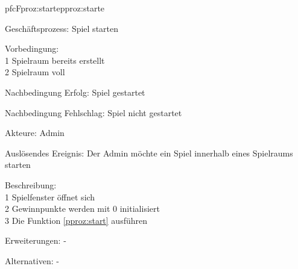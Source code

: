 \begin{description}[leftmargin=3em, style=sameline]
	
	
	\begin{php}{pfc}{F}{proz:starte}{pproz:starte}
		\item [Geschäftsprozess:] Spiel starten
		\item [Vorbedingung:]\hfill\\
		1 Spielraum bereits erstellt \\
		2 Spielraum  voll
		\item [Nachbedingung Erfolg:] Spiel gestartet
		\item [Nachbedingung Fehlschlag:] Spiel nicht gestartet
		\item [Akteure:] Admin
		\item [Auslösendes Ereignis:] Der Admin möchte ein Spiel innerhalb eines Spielraums starten
		\item [Beschreibung:]\hfill\\
		1 Spielfenster öffnet sich \\
		2 Gewinnpunkte werden mit 0 initialisiert \\
		3 Die Funktion \ref{pproz:start} ausführen 
		\item [Erweiterungen:] -
		\item [Alternativen:] -
	\end{php}
	

\end{description}
